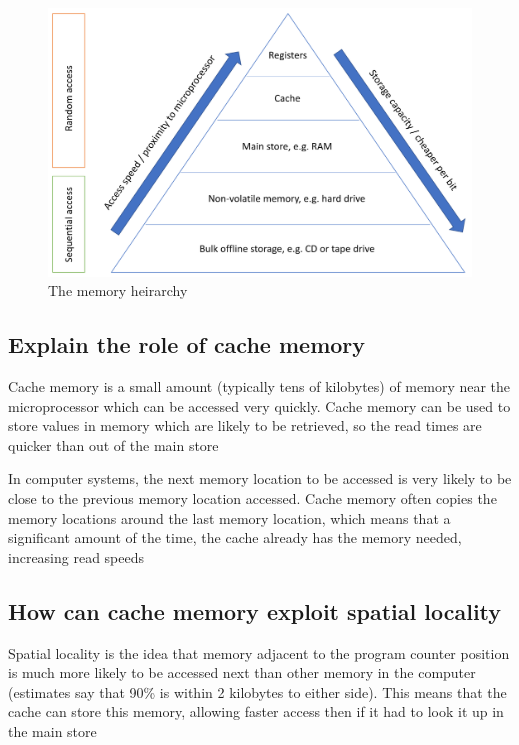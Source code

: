 \documentclass{article}
\begin{document}
\begin{figure}
\centering
\includegraphics[width=\textwidth]{./memoryHeirarchy.png}
\caption{The memory heirarchy}
\end{figure}


\subsection{Explain the role of cache memory}

Cache memory is a small amount (typically tens of kilobytes) of memory
near the microprocessor which can be accessed very quickly. Cache memory
can be used to store values in memory which are likely to be retrieved,
so the read times are quicker than out of the main store

In computer systems, the next memory location to be accessed is very
likely to be close to the previous memory location accessed. Cache
memory often copies the memory locations around the last memory
location, which means that a significant amount of the time, the cache
already has the memory needed, increasing read speeds


\subsection{How can cache memory exploit spatial locality}

Spatial locality is the idea that memory adjacent to the program counter
position is much more likely to be accessed next than other memory in
the computer (estimates say that 90\% is within 2 kilobytes to either
side). This means that the cache can store this memory, allowing faster
access then if it had to look it up in the main store
\end{document}
